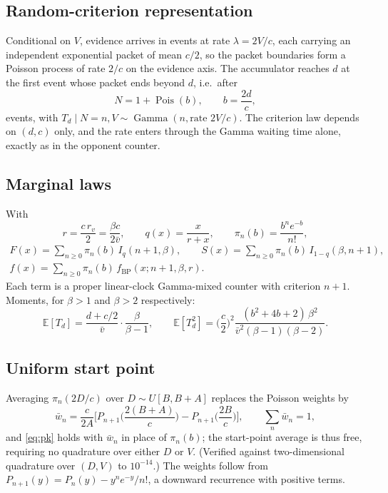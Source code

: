\documentclass[11pt]{article}
\newcommand{\Pois}{\operatorname{Pois}}
\newcommand{\Gam}{\operatorname{Gamma}}
\newcommand{\E}{\mathbb{E}}
\newcommand{\Ireg}{I}
\begin{document}
\subsection{Random-criterion representation}
Conditional on $V$, evidence arrives in events at rate $\lambda=2V/c$, each carrying an independent exponential packet of mean $c/2$, so the packet boundaries form a Poisson process of rate $2/c$ on the evidence axis. The accumulator reaches $d$ at the first event whose packet ends beyond $d$, i.e.\ after
\begin{equation}
N=1+\Pois(b),\qquad b=\frac{2d}{c},
\end{equation}
events, with $T_d\mid N=n,V\sim\Gam(n,\text{rate }2V/c)$. The criterion law depends on $(d,c)$ only, and the rate enters through the Gamma waiting time alone, exactly as in the opponent counter.

\subsection{Marginal laws}
With
\begin{equation}
r=\frac{c\,r_v}{2}=\frac{\beta c}{2\bar v},\qquad q(x)=\frac{x}{r+x},\qquad \pi_n(b)=\frac{b^{n}e^{-b}}{n!},
\end{equation}
\begin{equation}
\begin{gathered}
F(x)=\sum_{n\ge0}\pi_n(b)\,\Ireg_{q}(n+1,\beta),\qquad
S(x)=\sum_{n\ge0}\pi_n(b)\,\Ireg_{1-q}(\beta,n+1),\\
f(x)=\sum_{n\ge0}\pi_n(b)\,f_{\mathrm{BP}}(x;n+1,\beta,r).
\end{gathered}
\label{eq:pk}
\end{equation}
Each term is a proper linear-clock Gamma-mixed counter with criterion $n+1$. Moments, for $\beta>1$ and $\beta>2$ respectively:
\[
\E[T_d]=\frac{d+c/2}{\bar v}\cdot\frac{\beta}{\beta-1},\qquad
\E[T_d^2]=\Big(\frac{c}{2}\Big)^{2}\frac{(b^2+4b+2)\,\beta^2}{\bar v^{2}(\beta-1)(\beta-2)} .
\]

\subsection{Uniform start point}
Averaging $\pi_n(2D/c)$ over $D\sim U[B,B+A]$ replaces the Poisson weights by
\begin{equation}
\bar w_n=\frac{c}{2A}\Big[P_{n+1}\!\Big(\frac{2(B+A)}{c}\Big)-P_{n+1}\!\Big(\frac{2B}{c}\Big)\Big],\qquad \sum_n\bar w_n=1,
\label{eq:pkw}
\end{equation}
and \eqref{eq:pk} holds with $\bar w_n$ in place of $\pi_n(b)$; the start-point average is thus free, requiring no quadrature over either $D$ or $V$. (Verified against two-dimensional quadrature over $(D,V)$ to $10^{-14}$.) The weights follow from $P_{n+1}(y)=P_n(y)-y^{n}e^{-y}/n!$, a downward recurrence with positive terms.
\end{document}
